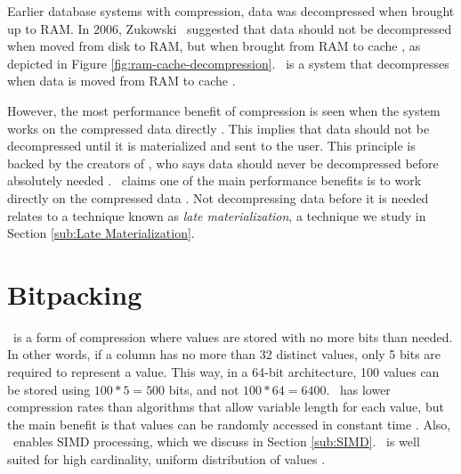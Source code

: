 
Earlier database systems with compression, data was decompressed when brought up to RAM. In 2006, Zukowski \ea~suggested that data should not be decompressed when moved from disk to RAM, but when brought from RAM to cache \cite{Zukowski2006-oz}, as depicted in Figure \ref{fig:ram-cache-decompression}. \monetx~is a system that decompresses when data is moved from RAM to cache \cite{Johnson2008-cp}.

However, the most performance benefit of compression is seen when the system works on the compressed data directly \cite{Lemke2010-is}. This implies that data should not be decompressed until it is materialized and sent to the user. This principle is backed by the creators of \blink, who says data should never be decompressed before absolutely needed \cite{Barber2012-xt}. \oracle~claims one of the main performance benefits is to work directly on the compressed data \cite{Oracle2015-fs}. Not decompressing data before it is needed relates to a technique known as \textit{late materialization}, a technique we study in Section \ref{sub:Late Materialization}. 

\section{Bitpacking}
\label{sec:Bitpacking}


\bp~is a form of compression where values are stored with no more bits than needed. In other words, if a column has no more than 32 distinct values, only 5 bits are required to represent a value. This way, in a 64-bit architecture, 100 values can be stored using $100*5 = 500$ bits, and not $100*64 = 6400$. \bp~has lower compression rates than algorithms that allow variable length for each value, but the main benefit is that values can be randomly accessed in constant time \cite{Raman2008-gi, Willhalm2013-ri}. Also, \bp~enables SIMD processing, which we discuss in Section \ref{sub:SIMD}. \bp~is well suited for high cardinality, uniform distribution of values \cite{Holloway2008-rr}.


